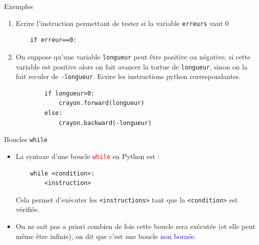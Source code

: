 \documentclass[10pt]{beamer}
\begin{document}
\begin{frame}[fragile]
	\mframe{\Python}
	\begin{exampleblock}{Exemples}
		\begin{enumerate}
			\item Ecrire l'instruction permettant de tester si la variable {\tt erreurs} vaut 0
			      \begin{lstlisting}
    if erreur==0:
		\end{lstlisting}
			\item On suppose qu'une variable {\tt longueur} peut être positive ou négative, si cette variable est positive alors on fait avancer la tortue de {\tt longueur}, sinon on la fait reculer de {\tt -longueur}.
			      Ecrire les instructions python correspondantes.
			      \begin{lstlisting}
		if longueur>0:
			crayon.forward(longueur)
		else:
			crayon.backward(-longueur)
	\end{lstlisting}
		\end{enumerate}
	\end{exampleblock}
\end{frame}


\begin{frame}[fragile]
	\mframe{\Python}
	\begin{alertblock}{Boucles {\tt while}}
		\begin{itemize}
			\item<2-> La syntaxe d'une boucle \textcolor{red}{\tt while}  en Python est :
			      \begin{lstlisting}
	while <condition>:
		<instruction>
	\end{lstlisting}
			      Cela permet d'exécuter les {\tt <instructions>} tant que la {\tt <condition>} est  vérifiée.
			\item<3->  On ne sait pas a priori combien de fois cette boucle sera exécutée (et elle peut même être infinie), on dit que c'est une boucle \textcolor{blue}{non bornée}.
		\end{itemize}
	\end{alertblock}
\end{frame}
\end{document}
